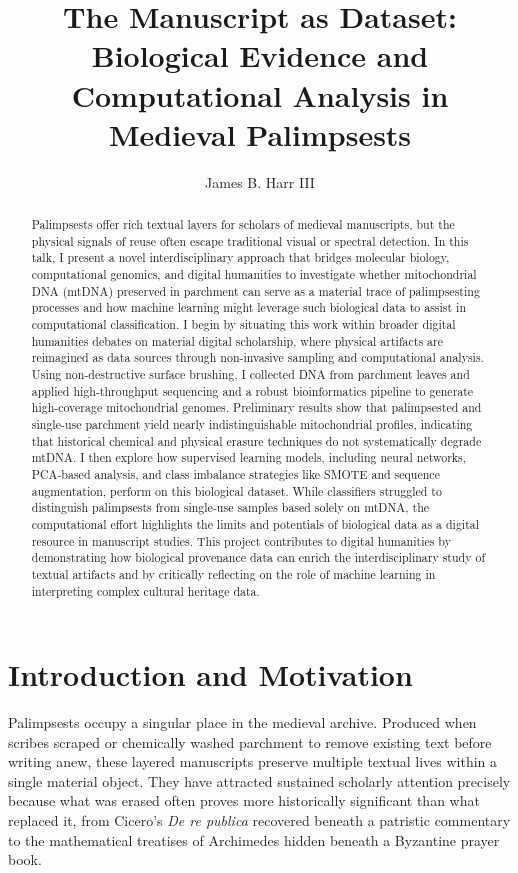 \documentclass[final]{anthology-ch} %
\title{The Manuscript as Dataset: Biological Evidence and Computational Analysis in Medieval Palimpsests}
\author[1]{James B. Harr III}[
  orcid=0000-0002-9644-8189
]
\affiliation{1}{Department of Data Science, The College of William and Mary}
\begin{document}
\maketitle

\begin{abstract}
Palimpsests offer rich textual layers for scholars of medieval manuscripts, but the physical signals of reuse often escape traditional visual or spectral detection. In this talk, I present a novel interdisciplinary approach that bridges molecular biology, computational genomics, and digital humanities to investigate whether mitochondrial DNA (mtDNA) preserved in parchment can serve as a material trace of palimpsesting processes and how machine learning might leverage such biological data to assist in computational classification. I begin by situating this work within broader digital humanities debates on material digital scholarship, where physical artifacts are reimagined as data sources through non-invasive sampling and computational analysis. Using non-destructive surface brushing, I collected DNA from parchment leaves and applied high-throughput sequencing and a robust bioinformatics pipeline to generate high-coverage mitochondrial genomes. Preliminary results show that palimpsested and single-use parchment yield nearly indistinguishable mitochondrial profiles, indicating that historical chemical and physical erasure techniques do not systematically degrade mtDNA. I then explore how supervised learning models, including neural networks, PCA-based analysis, and class imbalance strategies like SMOTE and sequence augmentation, perform on this biological dataset. While classifiers struggled to distinguish palimpsests from single-use samples based solely on mtDNA, the computational effort highlights the limits and potentials of biological data as a digital resource in manuscript studies. This project contributes to digital humanities by demonstrating how biological provenance data can enrich the interdisciplinary study of textual artifacts and by critically reflecting on the role of machine learning in interpreting complex cultural heritage data.
\end{abstract}

\section{Introduction and Motivation} \label{sec:intro}

Palimpsests occupy a singular place in the medieval archive. Produced when scribes scraped or chemically washed parchment to remove existing text before writing anew, these layered manuscripts preserve multiple textual lives within a single material object. They have attracted sustained scholarly attention precisely because what was erased often proves more historically significant than what replaced it, from Cicero's \textit{De re publica} recovered beneath a patristic commentary to the mathematical treatises of Archimedes hidden beneath a Byzantine prayer book.
\end{document}
